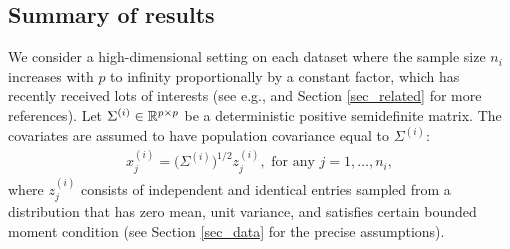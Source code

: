 \subsection{Summary of results}

We consider a high-dimensional setting on each dataset where the sample size $n_i$ increases with $p$ to infinity proportionally by a constant factor, which has recently received lots of interests (see e.g., \citet{hastie2019surprises} and Section \ref{sec_related} for more references).
Let $\Sigma^{(i)} \in \mathbb{R}^{p\times p}$ be a deterministic positive semidefinite matrix.
The covariates are assumed to have population covariance equal to $\Sigma^{(i)}$:
\begin{align}
    x_j^{(i)} = \big(\Sigma^{(i)}\big)^{1/2} z_{j}^{(i)}, \text{ for any } j = 1,\dots,n_i, \label{eq_rvm}
\end{align}
where $z_j^{(i)}$ consists of independent and identical entries sampled from a distribution that has zero mean, unit variance, and satisfies certain bounded moment condition (see Section \ref{sec_data} for the precise assumptions).

